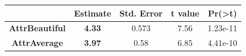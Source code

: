 \documentclass[]{book}
\theoremstyle{definition}
\theoremstyle{definition}
\theoremstyle{remark}
\begin{document}
\begin{longtable}[]{@{}ccccc@{}}
\toprule
\begin{minipage}[b]{0.27\columnwidth}\centering\strut
~\strut
\end{minipage} & \begin{minipage}[b]{0.13\columnwidth}\centering\strut
Estimate\strut
\end{minipage} & \begin{minipage}[b]{0.16\columnwidth}\centering\strut
Std. Error\strut
\end{minipage} & \begin{minipage}[b]{0.12\columnwidth}\centering\strut
t value\strut
\end{minipage} & \begin{minipage}[b]{0.12\columnwidth}\centering\strut
Pr(\textgreater{}\textbar{}t\textbar{})\strut
\end{minipage}\tabularnewline
\midrule
\endhead
\begin{minipage}[t]{0.27\columnwidth}\centering\strut
\textbf{AttrBeautiful}\strut
\end{minipage} & \begin{minipage}[t]{0.13\columnwidth}\centering\strut
\textbf{4.33}\strut
\end{minipage} & \begin{minipage}[t]{0.16\columnwidth}\centering\strut
0.573\strut
\end{minipage} & \begin{minipage}[t]{0.12\columnwidth}\centering\strut
7.56\strut
\end{minipage} & \begin{minipage}[t]{0.12\columnwidth}\centering\strut
1.23e-11\strut
\end{minipage}\tabularnewline
\begin{minipage}[t]{0.27\columnwidth}\centering\strut
\textbf{AttrAverage}\strut
\end{minipage} & \begin{minipage}[t]{0.13\columnwidth}\centering\strut
\textbf{3.97}\strut
\end{minipage} & \begin{minipage}[t]{0.16\columnwidth}\centering\strut
0.58\strut
\end{minipage} & \begin{minipage}[t]{0.12\columnwidth}\centering\strut
6.85\strut
\end{minipage} & \begin{minipage}[t]{0.12\columnwidth}\centering\strut
4.41e-10\strut

\end{minipage}
\end{longtable}
\end{document}
